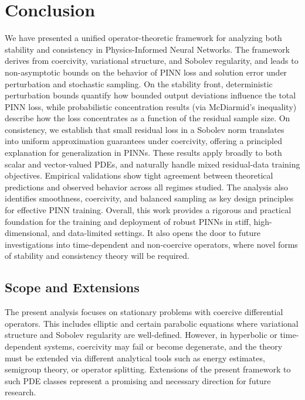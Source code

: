\documentclass[11pt, a4paper]{article}
\begin{document}
\section*{Conclusion}
We have presented a unified operator-theoretic framework for analyzing both stability and consistency in Physics-Informed Neural Networks. The framework derives from coercivity, variational structure, and Sobolev regularity, and leads to non-asymptotic bounds on the behavior of PINN loss and solution error under perturbation and stochastic sampling. On the stability front, deterministic perturbation bounds quantify how bounded output deviations influence the total PINN loss, while probabilistic concentration results (via McDiarmid's inequality) describe how the loss concentrates as a function of the residual sample size. On consistency, we establish that small residual loss in a Sobolev norm translates into uniform approximation guarantees under coercivity, offering a principled explanation for generalization in PINNs. These results apply broadly to both scalar and vector-valued PDEs, and naturally handle mixed residual-data training objectives. Empirical validations show tight agreement between theoretical predictions and observed behavior across all regimes studied. The analysis also identifies smoothness, coercivity, and balanced sampling as key design principles for effective PINN training. Overall, this work provides a rigorous and practical foundation for the training and deployment of robust PINNs in stiff, high-dimensional, and data-limited settings. It also opens the door to future investigations into time-dependent and non-coercive operators, where novel forms of stability and consistency theory will be required.

\vspace{1em}
\subsection*{Scope and Extensions}
The present analysis focuses on stationary problems with coercive differential operators. This includes elliptic and certain parabolic equations where variational structure and Sobolev regularity are well-defined. However, in hyperbolic or time-dependent systems, coercivity may fail or become degenerate, and the theory must be extended via different analytical tools such as energy estimates, semigroup theory, or operator splitting. Extensions of the present framework to such PDE classes represent a promising and necessary direction for future research.
\end{document}
